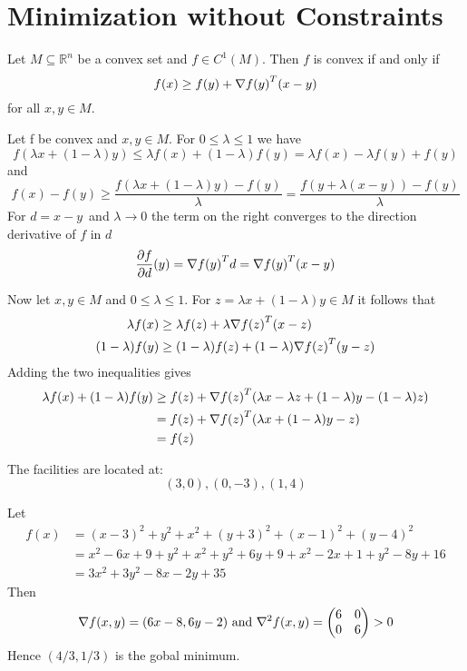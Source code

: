 
\newpage
\section{Minimization without Constraints}


\label{thm:lemma_gradient_inequality}
Let \(M \subseteq \mathbb{R}^n \) be a convex set and \(f \in C^1(M)\). Then \(f\) is convex if and only if
\[
    f(x) \ge f(y) + \nabla {f(y)}^T (x - y)
\]  
for all \(x, y \in M \). 

\proof{}
Let f be convex and \(x, y \in M\). For \( 0 \le \lambda \le 1 \) we have
\[ 
    f(\lambda x + (1 - \lambda) y) \le \lambda f(x) + (1 - \lambda)f(y) =  \lambda f(x) - \lambda f(y) + f(y) 
\] 
and 
\[ 
    f(x) - f(y) \ge \frac{f(\lambda x + (1 - \lambda) y) - f(y)}{\lambda}
        = \frac{f(y + \lambda (x - y)) - f(y)}{\lambda}
\]
For \( d = x - y \)\ and \( \lambda \to 0 \) the term on the right converges to the direction derivative of \( f \)
in \( d \)
\[
    \frac{\partial f}{\partial d}(y) = \nabla{f(y)}^T d = \nabla{f(y)}^T (x - y) 
\]

Now let \( x, y \in M \) and  \( 0 \le \lambda \le 1 \). For \( z = \lambda x + (1 - \lambda) y \in M \) it follows that
\[
    \begin{split}
        \lambda f(x) & \ge \lambda f(z) + \lambda \nabla {f(z)}^T (x - z) \\
            (1 - \lambda) f(y) & \ge (1 - \lambda) f(z) + (1 - \lambda) \nabla {f(z)}^T (y - z)
    \end{split}
\]
Adding the two inequalities gives
\[
    \begin{split}
       \lambda f(x) + (1 - \lambda) f(y) 
            & \ge f(z) + \nabla {f(z)}^T(\lambda x - \lambda z + (1- \lambda) y - (1-\lambda)z) \\
            & = f(z) + \nabla {f(z)}^T(\lambda x + (1- \lambda) y - z) \\
            & = f(z)
    \end{split}
\]
\bigskip


The facilities are located at:
\[
    (3, 0), (0, -3), (1, 4) 
\]

\proof{}
Let 
\[
    \begin{split}
        f(x)    & = {(x - 3)}^2 + y^2 + x^2 + {(y + 3)}^2 + {(x - 1)}^2 + {(y - 4)}^2 \\
                & = x^2 - 6x + 9 + y^2 + x^2 + y^2 + 6y + 9 + x^2 - 2x + 1 + y^2 -8y + 16 \\
                & = 3x^2 + 3y^2 - 8x - 2y + 35
    \end{split}
\]
Then
\[
    \nabla f(x, y) = (6x - 8, 6y - 2) \text{ and } \nabla^2 f(x, y) = 
        \begin{pmatrix}
            6 & 0 \\
            0 & 6 \\
        \end{pmatrix} > 0
\]
Hence \( (4 / 3, 1 / 3) \) is the gobal minimum. 
\bigskip


